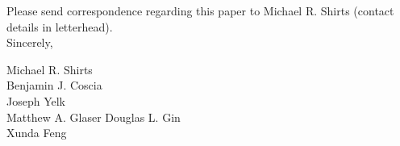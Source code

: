 \documentclass[fontsize=11pt]{article}
\begin{document}
	
	\noindent Please send correspondence regarding this paper to Michael R. Shirts (contact
	details in letterhead).\\	
	
	\noindent Sincerely,
	
	\noindent Michael R. Shirts \\
    \noindent Benjamin J. Coscia \\
    \noindent Joseph Yelk \\
    \noindent Matthew A. Glaser
    \noindent Douglas L. Gin \\
    \noindent Xunda Feng \\
	
\end{document}
